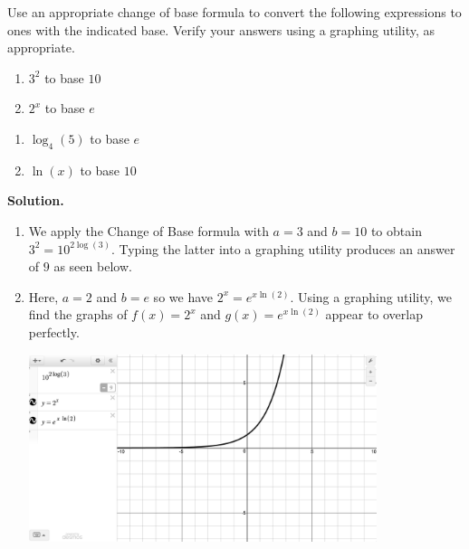 \begin{ex}  Use an appropriate change of base formula to convert the following expressions to ones with the indicated base.  Verify your answers using a graphing utility, as appropriate.
\begin{multicols}{2}
\begin{enumerate}

\item  $3^{2}$ to base $10$

\item  $2^{x}$ to base $e$

\setcounter{HW}{\value{enumi}}
\end{enumerate}
\end{multicols}

\begin{multicols}{2}
\begin{enumerate}
\setcounter{enumi}{\value{HW}}


\item $\log_{4}(5)$ to base $e$

\item $\ln(x)$ to base $10$

\end{enumerate}
\end{multicols}

{\bf Solution.}

\begin{enumerate}

\item  We apply the Change of Base formula with $a=3$ and $b=10$ to obtain $3^2 = 10^{2 \log(3)}$. Typing the latter into a graphing utility produces an answer of $9$ as seen below.

\item  Here, $a=2$ and $b = e$ so we have $2^{x} = e^{x \ln(2)}$.  Using a graphing utility, we find the graphs of $f(x) = 2^x$ and $g(x) = e^{x \ln(2)}$ appear to overlap perfectly.

\begin{center}

\includegraphics[width=4in]{./PropertiesofLogarithmsGraphics/LogProps01.jpg} 


\end{center}
\end{enumerate}
\end{ex}
